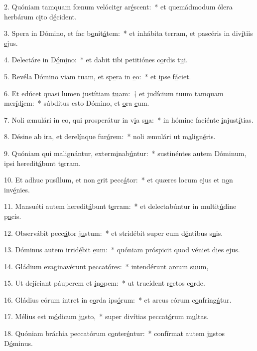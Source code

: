 2. Quóniam tamquam fœnum velócit\uline{e}r ar\uline{é}scent:~* et quemádmodum ólera herbárum c\uline{i}to d\uline{é}cident.\par 
3. Spera in Dómino, et fac b\uline{o}nit\uline{á}tem:~* et inhábita terram, et pascéris in div\uline{í}tiis \uline{e}jus.\par 
4. Delectáre in D\uline{ó}m\uline{i}no:~* et dabit tibi petitiónes c\uline{o}rdis t\uline{u}i.\par 
5. Revéla Dómino viam tuam, et sp\uline{e}ra in \uline{e}o:~* et \uline{i}pse f\uline{á}ciet.\par 
6. Et edúcet quasi lumen justítiam \uline{tu}am:~† et judícium tuum tamquam mer\uline{í}d\uline{i}em:~* súbditus esto Dómino, et \uline{o}ra \uline{e}um.\par 
7. Noli æmulári in eo, qui prosperátur in v\uline{i}a s\uline{u}a:~* in hómine faciénte \uline{i}njust\uline{í}tias.\par 
8. Désine ab ira, et derel\uline{í}nque fur\uline{ó}rem:~* noli æmulári ut m\uline{a}lign\uline{é}ris.\par 
9. Quóniam qui malignántur, exterm\uline{i}nab\uline{ú}ntur:~* sustinéntes autem Dóminum, ipsi heredit\uline{á}bunt t\uline{e}rram.\par 
10. Et adhuc pusíllum, et non \uline{e}rit pecc\uline{á}tor:~* et quæres locum ejus et n\uline{o}n inv\uline{é}nies.\par 
11. Mansuéti autem heredit\uline{á}bunt t\uline{e}rram:~* et delectabúntur in multit\uline{ú}dine p\uline{a}cis.\par 
12. Observábit pecc\uline{á}tor j\uline{u}stum:~* et stridébit super eum d\uline{é}ntibus s\uline{u}is.\par 
13. Dóminus autem irrid\uline{é}bit \uline{e}um:~* quóniam próspicit quod véniet d\uline{i}es \uline{e}jus.\par 
14. Gládium evaginavérunt p\uline{e}ccat\uline{ó}res:~* intendérunt \uline{a}rcum s\uline{u}um,\par 
15. Ut dejíciant páuperem et \uline{í}n\uline{o}pem:~* ut trucídent r\uline{e}ctos c\uline{o}rde.\par 
16. Gládius eórum intret in c\uline{o}rda ips\uline{ó}rum:~* et arcus eórum c\uline{o}nfring\uline{á}tur.\par 
17. Mélius est m\uline{ó}dicum j\uline{u}sto,~* super divítias peccat\uline{ó}rum m\uline{u}ltas.\par 
18. Quóniam bráchia peccatórum c\uline{o}nter\uline{é}ntur:~* confírmat autem j\uline{u}stos D\uline{ó}minus.\par 
